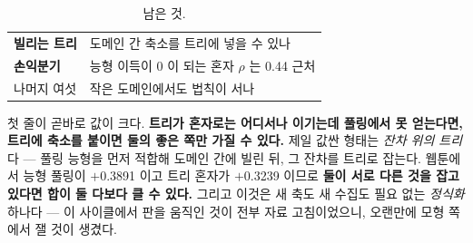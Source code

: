 \documentclass[10pt]{article}
\begin{document}

\begin{table}[t]
\centering\tsize
\caption{남은 것.}
\begin{tabular}{ll}
\toprule
\textbf{빌리는 트리} & 도메인 간 축소를 트리에 넣을 수 있나 \\
\textbf{손익분기} & 능형 이득이 0 이 되는 혼자 $\rho$ 는 0.44 근처 \\
나머지 여섯 & 작은 도메인에서도 법칙이 서나 \\
\bottomrule
\end{tabular}
\end{table}

첫 줄이 곧바로 값이 크다. \textbf{트리가 혼자로는 어디서나 이기는데
풀링에서 못 얻는다면, 트리에 축소를 붙이면 둘의 좋은 쪽만 가질 수 있다.}
제일 값싼 형태는 \emph{잔차 위의 트리}다 --- 풀링 능형을 먼저 적합해
도메인 간에 빌린 뒤, 그 잔차를 트리로 잡는다. 웹툰에서 능형 풀링이
$+$0.3891 이고 트리 혼자가 $+$0.3239 이므로 \textbf{둘이 서로 다른 것을
잡고 있다면 합이 둘 다보다 클 수 있다.} 그리고 이것은 새 축도 새 수집도
필요 없는 \emph{정식화} 하나다 --- 이 사이클에서 판을 움직인 것이 전부
자료 고침이었으니, 오랜만에 모형 쪽에서 잴 것이 생겼다.
\end{document}
